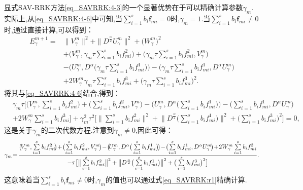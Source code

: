 显式SAV-RRK方法\eqref{eq_SAVRRK:4-3}的一个显著优势在于可以精确计算参数$\gamma_m$.
实际上,从\eqref{eq_SAVRRK:4-6}中可知,当$\sum\limits_{i=1}^s b_i \bm{f}_{m i}=0$时,$\gamma_m=1$.当$\sum\limits_{i=1}^s b_i \bm{f}_{m i}\neq 0$时,通过直接计算,可以得到：
\begin{align}
E_{\gamma}^{m+1}  = & \|V_{\gamma}^{m}\|^2+\|D^\frac{\alpha}{2} U_{\gamma}^{m}\|^2+\big(W_{\gamma}^{m}\big)^2 \nonumber\\
& + \big(V_{\gamma}^{m},\gamma_m\tau\sum\limits_{i=1}^{s}b_if_{mi}^2\big)+\big(\gamma_m\tau\sum\limits_{i=1}^{s}b_if_{mi}^2,V_{\gamma}^{m}\big)\nonumber\\
&-\big(U_{\gamma}^{m}, D^{\alpha}\big(\gamma_m\tau\sum\limits_{i=1}^{s}b_if_{mi}^1\big)\big)-\big(\gamma_m\tau\sum\limits_{i=1}^{s}b_if_{mi}^1, D^{\alpha} U_{\gamma}^{m}\big)\nonumber\\
&+2W_{\gamma}^{m}\gamma_m\tau\sum\limits_{i=1}^{s}b_if_{mi}^3+\big(\gamma_m\tau\sum\limits_{i=1}^{s}b_if_{mi}^3\big)^2.\label{eq_SAVRRK:49}
\end{align}
将其与\eqref{eq_SAVRRK:4-6}结合,得到：
\begin{align*}
&\gamma_m\tau\big[\big(V_{\gamma}^{m},\sum\limits_{i=1}^{s}b_if_{mi}^2\big)+\big(\sum\limits_{i=1}^{s}b_if_{mi}^2,V_{\gamma}^{m}\big)-\big(U_{\gamma}^{m},D^{\alpha}\big(\sum\limits_{i=1}^{s}b_if_{mi}^1\big)\big)-\big(\sum\limits_{i=1}^{s}b_if_{mi}^1, D^{\alpha} U_{\gamma}^{m}\big)\\
&+2W_{\gamma}^{m}\sum\limits_{i=1}^{s}b_if_{mi}^3\big] +\gamma_m^2\tau^2\big[\big\|\sum\limits_{i=1}^{s}b_if_{mi}^2\big\|^2+ \big\|D^\frac{\alpha}{2}\big(\sum\limits_{i=1}^{s}b_if_{mi}^1\big)\big\|^2+\big(\sum\limits_{i=1}^{s}b_if_{mi}^3\big)^2\big]=0,
\end{align*}
这是关于$\gamma_m$的二次代数方程.注意到$\gamma_m\neq 0$,因此可得：
\begin{equation}\label{eq_SAVRRK:r1}\small
\gamma_m \!=\! \frac{\big(\!V_{\gamma}^{m},\sum\limits_{i=1}^{s}b_if_{mi}^2\!\big)\!+\!\big(\!\sum\limits_{i=1}^{s}b_if_{mi}^2,V_{\gamma}^{m}\!\big)\!-\!\big(\!U_{\gamma}^{m},D^{\alpha}\big(\sum\limits_{i=1}^{s}b_if_{mi}^1\big)\!\big)\!-\!\big(\!\sum\limits_{i=1}^{s}b_if_{mi}^1, D^{\alpha} U_{\gamma}^{m}\!\big)\!+\!2W_{\gamma}^{m}\sum\limits_{i=1}^{s}b_if_{mi}^3}{-\tau\big[\big\|\sum\limits_{i=1}^{s}b_if_{mi}^2\big\|^2+\big\|D^\frac{\alpha}{2}\big(\sum\limits_{i=1}^{s}b_if_{mi}^1\big)\big\|^2+\big(\sum\limits_{i=1}^{s}b_if_{mi}^3\big)^2\big]} .
\end{equation}
这意味着当$\sum\limits_{i=1}^s b_i \bm{f}_{m i}\neq 0$时,$\gamma_m$的值也可以通过式\eqref{eq_SAVRRK:r1}精确计算.

